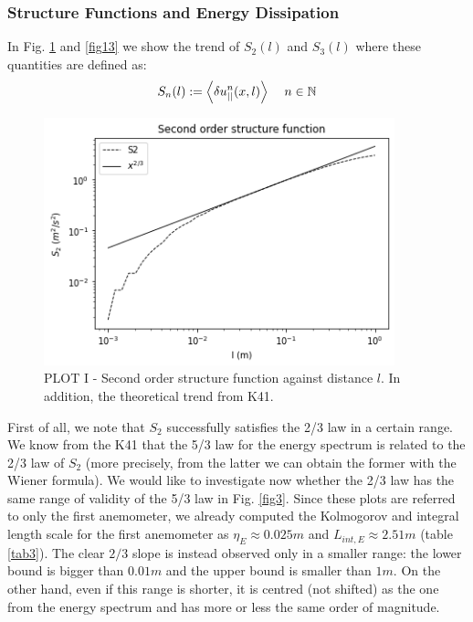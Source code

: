 \documentclass[11pt,titlepage]{article}
\begin{document}
\subsubsection{Structure Functions and Energy Dissipation}\label{structure_functions}
In Fig. \ref{fig12} and  \ref{fig13} we show the trend of $S_2(l)$ and $S_3(l)$ where these quantities are defined as:
\begin{equation*}
	S_n(l):= \left< \delta u_{||}^n(x,l) \right> \hspace{4mm} n \in \mathbb{N}
\end{equation*}
\begin{center}
	\begin{figure} [h]
		\centering
		\includegraphics[width = 4in]{./figures/ex1_7_1.png}
		\caption{PLOT I - Second order structure function against distance $l$. In addition, the theoretical trend from K41.}
		\label{fig12}
	\end{figure}
\end{center}
First of all, we note that $S_2$ successfully satisfies the 2/3 law in a certain range. We know from the K41 that the 5/3 law for the energy spectrum is related to the 2/3 law of $S_2$ (more precisely, from the latter we can obtain the former with the Wiener formula). We would like to investigate now whether the 2/3 law has the same range of validity of the 5/3 law in Fig. \ref{fig3}. Since these plots are referred to only the first anemometer, we already computed the Kolmogorov and integral length scale for the first anemometer as $\eta_E \approx 0.025m$ and $L_{int,E} \approx 2.51m$ (table \ref{tab3}). The clear $2/3$ slope is instead observed only in a smaller range: the lower bound is bigger than $0.01m$ and the upper bound is smaller than $1m$. On the other hand, even if this range is shorter, it is centred (not shifted) as the one from the energy spectrum and has more or less the same order of magnitude. \\
\end{document}

